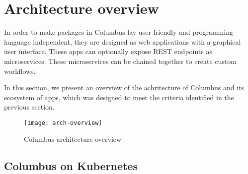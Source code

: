 \section{Architecture overview}
In order to make packages in Columbus lay user friendly and programming language independent, they 
are designed as web applications with a graphical user interface. These apps can optionally expose REST 
endpoints as microservices. These microservices can be chained together to create custom workflows.

In this section, we present an overview of the achritecture of Columbus and its ecosystem of apps,
which was designed to meet the criteria identified in the previous section.

\begin{figure}[t]
  \caption{Columbus architecture overview}
  \centering
  \texttt{[image: arch-overview]}
\end{figure}

\subsection{Columbus on Kubernetes}

